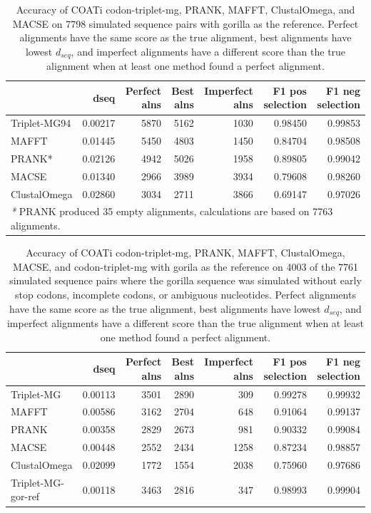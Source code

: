 \documentclass[
]{article}
\begin{document}
\begin{table}[H]

\caption{\label{tab:table-results-5}Accuracy of COATi codon-triplet-mg, PRANK, MAFFT, ClustalOmega, and MACSE on 7798 simulated sequence pairs with gorilla as the reference. Perfect alignments have the same score as the true alignment, best alignments have lowest $d_{seq}$, and imperfect alignments have a different score than the true alignment when at least one method found a perfect alignment.}
\centering
\begin{tabular}[t]{l|r|r|r|r|r|r}
\hline
  & dseq & Perfect alns & Best alns & Imperfect alns & F1 pos selection & F1 neg selection\\
\hline
Triplet-MG94 & 0.00217 & 5870 & 5162 & 1030 & 0.98450 & 0.99853\\
\hline
MAFFT & 0.01445 & 5450 & 4803 & 1450 & 0.84704 & 0.98508\\
\hline
PRANK* & 0.02126 & 4942 & 5026 & 1958 & 0.89805 & 0.99042\\
\hline
MACSE & 0.01340 & 2966 & 3989 & 3934 & 0.79608 & 0.98260\\
\hline
ClustalOmega & 0.02860 & 3034 & 2711 & 3866 & 0.69147 & 0.97026\\
\hline
\multicolumn{7}{l}{\rule{0pt}{1em}\textit{*} PRANK produced 35 empty alignments, calculations are based on 7763 alignments.}\\
\end{tabular}
\end{table}
\begin{table}[H]

\caption{\label{tab:table-results-6}Accuracy of COATi codon-triplet-mg, PRANK, MAFFT, ClustalOmega, MACSE, and codon-triplet-mg with gorila as the reference on 4003 of the 7761 simulated sequence pairs where the gorilla sequence was simulated without early stop codons, incomplete codons, or ambiguous nucleotides. Perfect alignments have the same score as the true alignment, best alignments have lowest $d_{seq}$, and imperfect alignments have a different score than the true alignment when at least one method found a perfect alignment.}
\centering
\begin{tabular}[t]{l|r|r|r|r|r|r}
\hline
  & dseq & Perfect alns & Best alns & Imperfect alns & F1 pos selection & F1 neg selection\\
\hline
Triplet-MG & 0.00113 & 3501 & 2890 & 309 & 0.99278 & 0.99932\\
\hline
MAFFT & 0.00586 & 3162 & 2704 & 648 & 0.91064 & 0.99137\\
\hline
PRANK & 0.00358 & 2829 & 2673 & 981 & 0.90332 & 0.99084\\
\hline
MACSE & 0.00448 & 2552 & 2434 & 1258 & 0.87234 & 0.98857\\
\hline
ClustalOmega & 0.02099 & 1772 & 1554 & 2038 & 0.75960 & 0.97686\\
\hline
Triplet-MG-gor-ref & 0.00118 & 3463 & 2816 & 347 & 0.98993 & 0.99904\\
\hline
\end{tabular}
\end{table}
\end{document}
